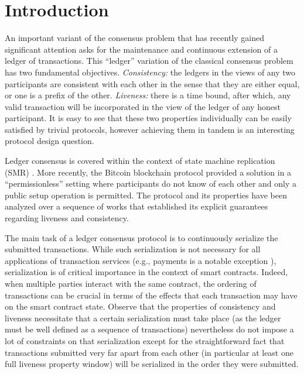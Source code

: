 \section{Introduction}
\label{sec:introduction}

An important variant of the consensus problem \cite{JACM:PeaShoLam80} that has recently gained significant attention asks for the maintenance and continuous extension of a ledger of transactions.
%
This ``ledger'' variation of the classical consensus problem has two fundamental objectives.
%
\emph{Consistency:} the ledgers in the views of any two participants are consistent with each other in the sense that they are either equal, or one is a prefix of the other.
%
\emph{Liveness:} there is a time bound, after which, any valid transaction will be incorporated in the view of the ledger of any honest participant.
%
It is easy to see that these two properties individually can be easily satisfied by trivial protocols, however achieving them in tandem is an interesting protocol design question.

Ledger consensus is covered within the context of state machine replication (SMR) \cite{CSUR:Schneider90}.
%
More recently, the Bitcoin blockchain protocol \cite{Nak08} provided a solution in a ``permissionless'' setting where participants do not know of each other and only a public setup operation is permitted.
%
The protocol and its properties have been analyzed over a sequence of works \cite{EC:GarKiaLeo15,EC:PasSeeash17,C:GarKiaLeo17} that established its explicit guarantees regarding liveness and consistency.

The main task of a ledger consensus protocol is to continuously serialize the submitted transactions.
%
While such serialization is not necessary for all applications of transaction services (e.g., payments is a notable exception \cite{NDSS:DanMei16,DC:GKMPS22}), serialization is of critical importance in the context of smart contracts.
%
Indeed, when multiple parties interact with the same contract, the ordering of transactions can be crucial in terms of the effects that each transaction may have on the smart contract state.
%
Observe that the properties of consistency and liveness necessitate that a certain serialization must take place (as the ledger must be well defined as a sequence of transactions) nevertheless do not impose a lot of constraints on that serialization except for the straightforward fact that transactions submitted very far apart from each other (in particular at least one full liveness property window) will be serialized in the order they were submitted.

